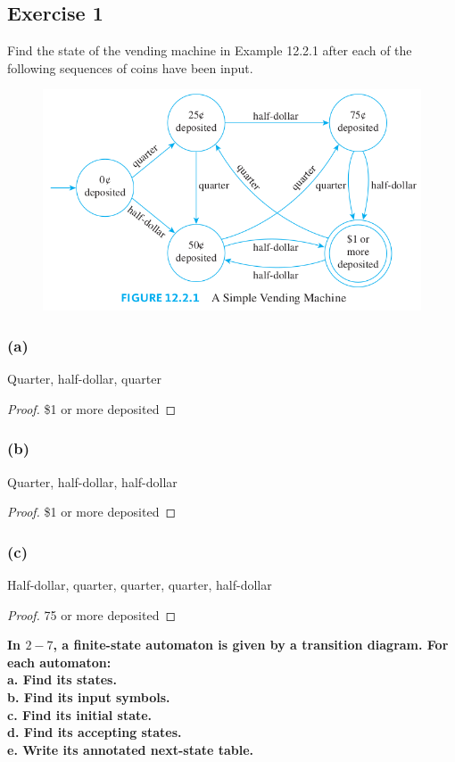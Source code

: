 \documentclass[14pt]{extarticle}
\newcommand{\cy}{\color{cyan}}
\begin{document}
\subsection{Exercise 1}
Find the state of the vending machine in Example 12.2.1 after each of the following sequences of coins have been input.

\begin{figure}[ht!]
\centering
\includegraphics[scale=0.4]{../images/12.2.1.png}
\end{figure}

\subsubsection{(a)}
Quarter, half-dollar, quarter
\begin{proof}
\$1 or more deposited
\end{proof}

\subsubsection{(b)}
Quarter, half-dollar, half-dollar
\begin{proof}
\$1 or more deposited
\end{proof}

\subsubsection{(c)}
Half-dollar, quarter, quarter, quarter, half-dollar
\begin{proof}
75\textcentoldstyle{} or more deposited
\end{proof}

{\bf \cy In \(2-7\), a finite-state automaton is given by a transition diagram. For each automaton: \\
a. Find its states. \\
b. Find its input symbols. \\
c. Find its initial state. \\
d. Find its accepting states. \\
e. Write its annotated next-state table.}
\end{document}
